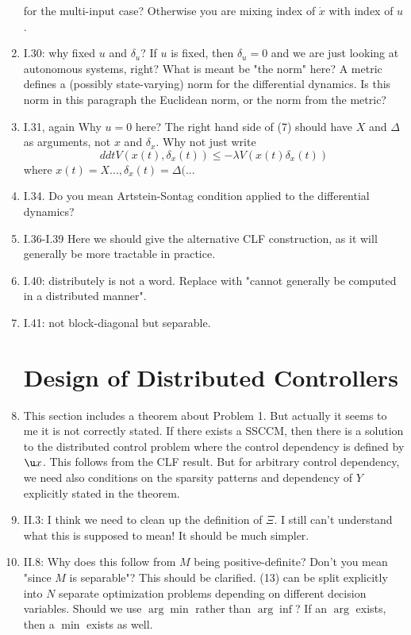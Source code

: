 \documentclass[11pt]{article}
\begin{document}
\begin{enumerate}
\[	\]
	for the multi-input case? Otherwise you are mixing index of $\dot x$ with index of $u$.
	\item I.30: why fixed $u$ and $\delta_u$? If $u$ is fixed, then $\delta_u=0$ and we are just looking at autonomous systems, right? What is meant be "the norm" here? A metric defines a (possibly state-varying) norm for the differential dynamics. Is this norm in this paragraph the Euclidean norm, or the norm from the metric?
	\item I.31, again Why $u=0$ here? The right hand side of (7) should have $X$ and $\Delta$ as arguments, not $x$ and $\delta_x$. Why not just write
	\[
	ddt V(x(t),\delta_x(t))\le -\lambda V(x(t)\delta_x(t))
	\]
	where $x(t)=X..., \delta_x(t) = \Delta(...$
	\item I.34. Do you mean Artstein-Sontag condition applied to the differential dynamics?
	\item I.36-I.39 Here we should give the alternative CLF construction, as it will generally be more tractable in practice.
	\item I.40: distributely is not a word. Replace with "cannot generally be computed in a distributed manner".
	\item I.41: not block-diagonal but separable.
\section{Design of Distributed Controllers}
\item This section includes a theorem about Problem 1. But actually it seems to me it is not correctly stated. If there exists a SSCCM, then there is a solution to the distributed control problem where the control dependency is defined by $\u x$. This follows from the CLF result. But for arbitrary control dependency, we need also conditions on the sparsity patterns and dependency of $Y$ explicitly stated in the theorem.
\item II.3: I think we need to clean up the definition of $\Xi$. I still can't understand what this is supposed to mean! It should be much simpler.
\item II.8: Why does this follow from $M$ being positive-definite? Don't you mean "since $M$ is separable"? This should be clarified. (13) can be split explicitly into $N$ separate optimization problems depending on different decision variables. Should we use $\arg\min$ rather than $\arg\inf$? If an $\arg$ exists, then a $\min$ exists as well.

\end{enumerate}
\end{document}
